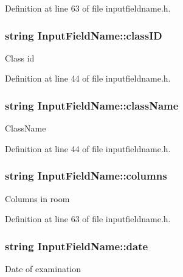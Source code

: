 \-Definition at line 63 of file inputfieldname.\-h.

\hypertarget{classInputFieldName_a6a67c361f3b631fb6c3620c14a615fb9}{
\subsubsection[{class\-I\-D}]{\setlength{\rightskip}{0pt plus 5cm}string {\bf \-Input\-Field\-Name\-::class\-I\-D}}}\label{classInputFieldName_a6a67c361f3b631fb6c3620c14a615fb9}
\-Class id 

\-Definition at line 44 of file inputfieldname.\-h.

\hypertarget{classInputFieldName_ad8b28ebeabdabb5967542e317f549280}{
\subsubsection[{class\-Name}]{\setlength{\rightskip}{0pt plus 5cm}string {\bf \-Input\-Field\-Name\-::class\-Name}}}\label{classInputFieldName_ad8b28ebeabdabb5967542e317f549280}
\-Class\-Name 

\-Definition at line 44 of file inputfieldname.\-h.

\hypertarget{classInputFieldName_abca049f347e589f24b672c19907c5c72}{
\subsubsection[{columns}]{\setlength{\rightskip}{0pt plus 5cm}string {\bf \-Input\-Field\-Name\-::columns}}}\label{classInputFieldName_abca049f347e589f24b672c19907c5c72}
\-Columns in room 

\-Definition at line 63 of file inputfieldname.\-h.

\hypertarget{classInputFieldName_afb053a44abe76e108533e23902e90321}{
\subsubsection[{date}]{\setlength{\rightskip}{0pt plus 5cm}string {\bf \-Input\-Field\-Name\-::date}}}\label{classInputFieldName_afb053a44abe76e108533e23902e90321}
\-Date of examination 

